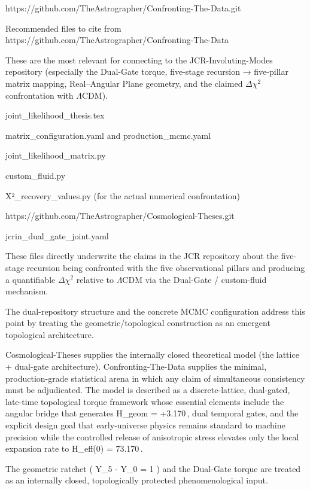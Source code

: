 https://github.com/TheAstrographer/Confronting-The-Data.git

Recommended files to cite from https://github.com/TheAstrographer/Confronting-The-Data

These are the most relevant for connecting to the JCR-Involuting-Modes repository (especially the Dual-Gate torque, five-stage recursion → five-pillar matrix mapping, Real–Angular Plane geometry, and the claimed \(\Delta\chi^2\) confrontation with \(\Lambda\)CDM).

joint_likelihood_thesis.tex  
   
matrix_configuration.yaml and production_mcmc.yaml  

joint_likelihood_matrix.py  
   
custom_fluid.py  

X²_recovery_values.py (for the actual numerical confrontation)

https://github.com/TheAstrographer/Cosmological-Theses.git

jcrin_dual_gate_joint.yaml

These files directly underwrite the claims in the JCR repository about the five-stage recursion being confronted with the five observational pillars and producing a quantifiable \(\Delta\chi^2\) relative to \(\Lambda\)CDM via the Dual-Gate / custom-fluid mechanism.

The dual-repository structure and the concrete MCMC configuration address this point by treating the geometric/topological construction as an emergent topological architecture.

Cosmological-Theses supplies the internally closed theoretical model (the lattice + dual-gate architecture).
Confronting-The-Data supplies the minimal, production-grade statistical arena in which any claim of simultaneous consistency must be adjudicated.
The model is described as a discrete-lattice, dual-gated, late-time topological torque framework whose essential elements include the angular bridge
\psi {}
that generates
\delta H_{\rm geom} = +3.170\,, dual temporal gates, and the explicit design goal that early-universe physics remains standard
\LambdaCDM to machine precision while the controlled release of anisotropic stress elevates only the local expansion rate to
H_{\rm eff}(0) = 73.170\,.

The geometric ratchet (
Y_5 - Y_0 = 1
) and the Dual-Gate torque are treated as an internally closed, topologically protected phenomenological input.

